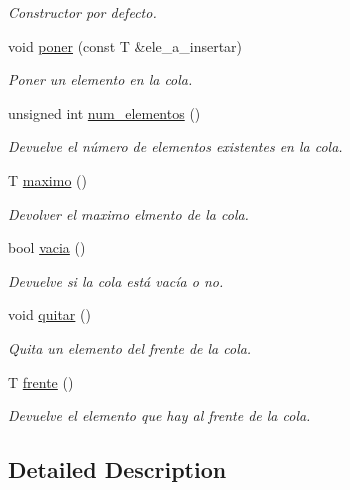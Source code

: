 \begin{DoxyCompactItemize}
\begin{DoxyCompactList}\small\item\em Constructor por defecto. \end{DoxyCompactList}\item 
void \mbox{\hyperlink{class_cola__max_ad890c67350050045a6531e2c84baacbb}{poner}} (const T \&ele\+\_\+a\+\_\+insertar)
\begin{DoxyCompactList}\small\item\em Poner un elemento en la cola. \end{DoxyCompactList}\item 
unsigned int \mbox{\hyperlink{class_cola__max_aa3ece318ef28ed910c378f33e9a1d172}{num\+\_\+elementos}} ()
\begin{DoxyCompactList}\small\item\em Devuelve el número de elementos existentes en la cola. \end{DoxyCompactList}\item 
T \mbox{\hyperlink{class_cola__max_a3df6075351dfd7c9e9a436a6d430e170}{maximo}} ()
\begin{DoxyCompactList}\small\item\em Devolver el maximo elmento de la cola. \end{DoxyCompactList}\item 
bool \mbox{\hyperlink{class_cola__max_af0b18f86af91ef94d7a035f87a4dcb2b}{vacia}} ()
\begin{DoxyCompactList}\small\item\em Devuelve si la cola está vacía o no. \end{DoxyCompactList}\item 
void \mbox{\hyperlink{class_cola__max_a21f1d915c674522d438f8288177e7ecb}{quitar}} ()
\begin{DoxyCompactList}\small\item\em Quita un elemento del frente de la cola. \end{DoxyCompactList}\item 
T \mbox{\hyperlink{class_cola__max_ad24d6ded47e7696c53dd10e33cce403e}{frente}} ()
\begin{DoxyCompactList}\small\item\em Devuelve el elemento que hay al frente de la cola. \end{DoxyCompactList}\end{DoxyCompactItemize}


\subsection{Detailed Description}
